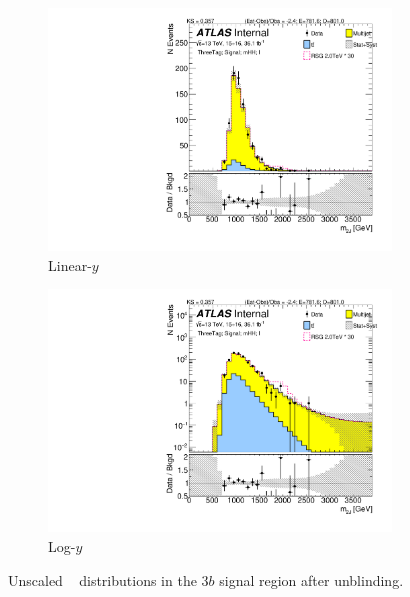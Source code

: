 \begin{figure}[htb!]
\begin{center}
    \captionsetup{justification=centering}
    \begin{subfigure}[b]{0.45\textwidth}
        \includegraphics[width=\textwidth,angle=-90]{figures/boosted/Signal_Syst/Moriond_bkg_9_ThreeTag_Signal_mHH_l.pdf}
        \caption{Linear-$y$}
        \label{fig:boosted-3b-signal-lin}
    \end{subfigure}
    \quad
    \begin{subfigure}[b]{0.45\textwidth}
        \includegraphics[width=\textwidth,angle=-90]{figures/boosted/Signal_Syst/Moriond_bkg_9_ThreeTag_Signal_mHH_l_1.pdf}
        \caption{Log-$y$}
        \label{fig:boosted-3b-signal-log}
    \end{subfigure}
  \caption{Unscaled \mtwoJ~ distributions in the $3b$ signal region after unblinding.}
  \label{fig:boosted-3b-signal-l}
\end{center}
\end{figure}

